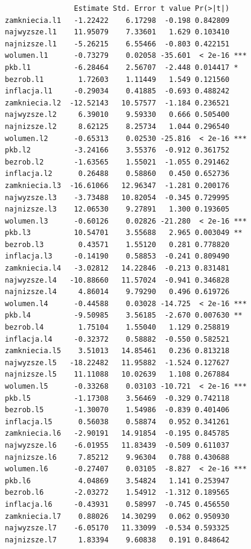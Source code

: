 \documentclass[
  polish,
  letterpaper,
  DIV=11,
  numbers=noendperiod]{scrartcl}
\begin{document}
\begin{verbatim}
                Estimate Std. Error t value Pr(>|t|)    
zamkniecia.l1   -1.22422    6.17298  -0.198 0.842809    
najwyzsze.l1    11.95079    7.33601   1.629 0.103410    
najnizsze.l1    -5.26215    6.55466  -0.803 0.422151    
wolumen.l1      -0.73279    0.02058 -35.601  < 2e-16 ***
pkb.l1          -6.28464    2.56707  -2.448 0.014417 *  
bezrob.l1        1.72603    1.11449   1.549 0.121560    
inflacja.l1     -0.29034    0.41885  -0.693 0.488242    
zamkniecia.l2  -12.52143   10.57577  -1.184 0.236521    
najwyzsze.l2     6.39010    9.59330   0.666 0.505400    
najnizsze.l2     8.62125    8.25734   1.044 0.296540    
wolumen.l2      -0.65313    0.02530 -25.816  < 2e-16 ***
pkb.l2          -3.24166    3.55376  -0.912 0.361752    
bezrob.l2       -1.63565    1.55021  -1.055 0.291462    
inflacja.l2      0.26488    0.58860   0.450 0.652736    
zamkniecia.l3  -16.61066   12.96347  -1.281 0.200176    
najwyzsze.l3    -3.73488   10.82054  -0.345 0.729995    
najnizsze.l3    12.06530    9.27891   1.300 0.193605    
wolumen.l3      -0.60126    0.02826 -21.280  < 2e-16 ***
pkb.l3          10.54701    3.55688   2.965 0.003049 ** 
bezrob.l3        0.43571    1.55120   0.281 0.778820    
inflacja.l3     -0.14190    0.58853  -0.241 0.809490    
zamkniecia.l4   -3.02812   14.22846  -0.213 0.831481    
najwyzsze.l4   -10.88660   11.57024  -0.941 0.346828    
najnizsze.l4     4.86014    9.79290   0.496 0.619726    
wolumen.l4      -0.44588    0.03028 -14.725  < 2e-16 ***
pkb.l4          -9.50985    3.56185  -2.670 0.007630 ** 
bezrob.l4        1.75104    1.55040   1.129 0.258819    
inflacja.l4     -0.32372    0.58882  -0.550 0.582521    
zamkniecia.l5    3.51013   14.85461   0.236 0.813218    
najwyzsze.l5   -18.22482   11.95882  -1.524 0.127627    
najnizsze.l5    11.11088   10.02639   1.108 0.267884    
wolumen.l5      -0.33268    0.03103 -10.721  < 2e-16 ***
pkb.l5          -1.17308    3.56469  -0.329 0.742118    
bezrob.l5       -1.30070    1.54986  -0.839 0.401406    
inflacja.l5      0.56038    0.58874   0.952 0.341261    
zamkniecia.l6   -2.90191   14.91854  -0.195 0.845785    
najwyzsze.l6    -6.01955   11.83439  -0.509 0.611037    
najnizsze.l6     7.85212    9.96304   0.788 0.430688    
wolumen.l6      -0.27407    0.03105  -8.827  < 2e-16 ***
pkb.l6           4.04869    3.54824   1.141 0.253947    
bezrob.l6       -2.03272    1.54912  -1.312 0.189565    
inflacja.l6     -0.43931    0.58997  -0.745 0.456550    
zamkniecia.l7    0.88026   14.30299   0.062 0.950930    
najwyzsze.l7    -6.05170   11.33099  -0.534 0.593325    
najnizsze.l7     1.83394    9.60838   0.191 0.848642    

\end{verbatim}
\end{document}
